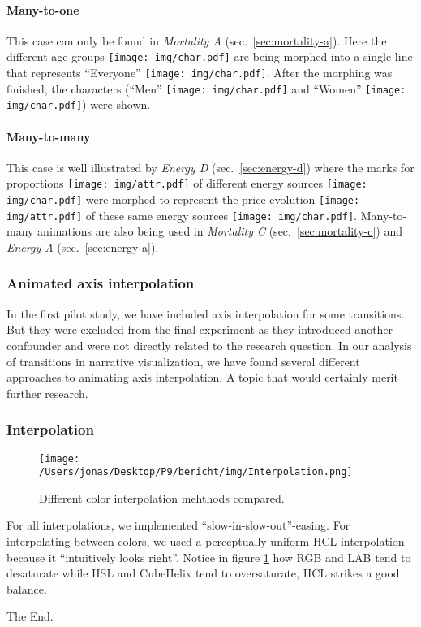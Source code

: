 \begin{flushleft}
\hypertarget{many-to-one}{%
\paragraph{Many-to-one}\label{many-to-one}}

This case can only be found in \emph{Mortality A}
(sec.~\ref{sec:mortality-a}). Here the different age groups
\texttt{[image: img/char.pdf]} are being morphed into a single line that
represents ``Everyone'' \texttt{[image: img/char.pdf]}. After the
morphing was finished, the characters (``Men''
\texttt{[image: img/char.pdf]} and ``Women''
\texttt{[image: img/char.pdf]}) were shown.

\hypertarget{many-to-many}{%
\paragraph{Many-to-many}\label{many-to-many}}

This case is well illustrated by \emph{Energy D}
(sec.~\ref{sec:energy-d}) where the marks for proportions
\texttt{[image: img/attr.pdf]} of different energy sources
\texttt{[image: img/char.pdf]} were morphed to represent the price
evolution \texttt{[image: img/attr.pdf]} of these same energy sources
\texttt{[image: img/char.pdf]}. Many-to-many animations are also being
used in \emph{Mortality C} (sec.~\ref{sec:mortality-c}) and \emph{Energy
A} (sec.~\ref{sec:energy-a}).

\hypertarget{animated-axis-interpolation}{%
\subsubsection{Animated axis
interpolation}\label{animated-axis-interpolation}}

In the first pilot study, we have included axis interpolation for some
transitions. But they
were excluded from the final experiment as they introduced another
confounder and were not directly related to the research question. In
our analysis of transitions in narrative visualization, we have found
several different approaches to animating axis interpolation. A topic
that would certainly merit further research.

\hypertarget{interpolation}{%
\subsubsection{Interpolation}\label{interpolation}}

\begin{figure}
\centering
\texttt{[image: /Users/jonas/Desktop/P9/bericht/img/Interpolation.png]}
\caption{Different color interpolation mehthods compared. \label{design-interpolation}}
\end{figure}

For all interpolations, we implemented ``slow-in-slow-out''-easing. For interpolating between colors, we used a
perceptually uniform HCL-interpolation because it ``intuitively looks
right''. Notice in figure \ref{design-interpolation} how RGB and
LAB tend to desaturate while HSL and CubeHelix tend to oversaturate, HCL
strikes a good balance.
\end{flushleft}
\newpage


\vspace*{\fill}
The End.
\vspace*{\fill}
